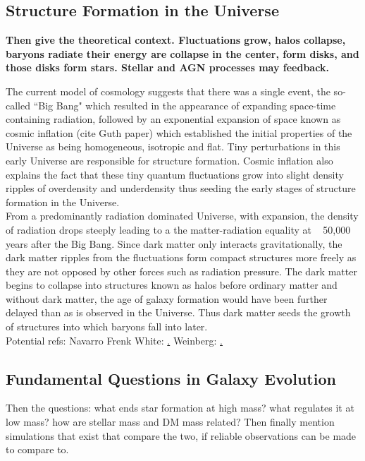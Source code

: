 \subsection{Structure Formation in the Universe}
{\bf Then give the theoretical context.
Fluctuations grow, halos collapse, baryons radiate their
energy are collapse in the center, form disks, and those
disks form stars. Stellar and AGN processes may feedback.}

The current model of cosmology suggests that there was a single event, the so-called ``Big Bang" which resulted in the appearance of expanding space-time containing radiation, followed by an exponential expansion of space known as cosmic inflation (cite Guth paper) which established the initial properties of the Universe as being homogeneous, isotropic and flat. Tiny perturbations in this early Universe are responsible for structure formation. Cosmic inflation also explains the fact that these tiny quantum fluctuations grow into slight density ripples of overdensity and underdensity thus seeding the early stages of structure formation in the Universe.\\

From a predominantly radiation dominated Universe, with expansion, the density of radiation drops steeply leading to a the matter-radiation equality at ~ 50,000 years after the Big Bang. Since dark matter only interacts gravitationally, the dark matter ripples from the fluctuations form compact structures more freely as they are not opposed by other forces such as radiation pressure. The dark matter begins to collapse into structures known as halos before ordinary matter and without dark matter, the age of galaxy formation would have been further delayed than as is observed in the Universe. Thus dark matter seeds the growth of structures into which baryons fall into later.\\

Potential refs:
Navarro Frenk White: \href{http://iopscience.iop.org/article/10.1086/304888/meta}.
Weinberg: \href{https://www.pnas.org/content/112/40/12249#ref-4}.



\subsection{Fundamental Questions in Galaxy Evolution}
{Then the questions: what ends star formation at high mass?
what  regulates it at low mass? how are 
stellar mass and DM mass related? Then finally mention
simulations that exist that compare the two, if reliable
observations can be made to compare to.}

